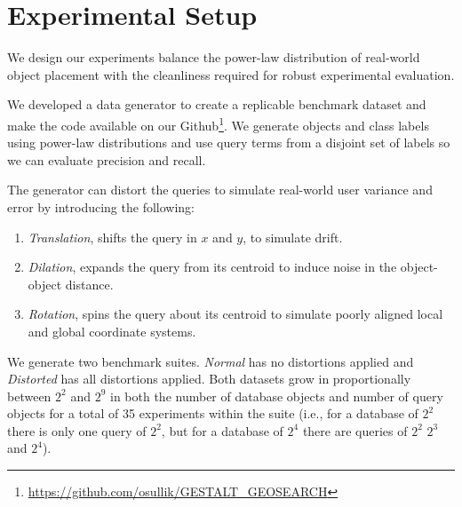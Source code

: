 \section{Experimental Setup}
\label{section:experimental_setup}


\par{
    We design our experiments balance the power-law distribution of real-world object placement with the cleanliness required for robust experimental evaluation. 
    }  
    
\par{
    We developed a data generator to create a replicable benchmark dataset and make the code available on our Github\footnote{\url{https://github.com/osullik/GESTALT_GEOSEARCH}}. We generate objects and class labels using power-law distributions and use query terms from a disjoint set of labels so we can evaluate precision and recall.
    }
   
\par{
    The generator can distort the queries to simulate real-world user variance and error by introducing the following:
    \begin{enumerate}
        \item \textit{Translation}, shifts the query in $x$ and $y$, to simulate drift.
        \item \textit{Dilation}, expands the query from its centroid to induce noise in the object-object distance.
        \item \textit{Rotation}, spins the query about its centroid to simulate poorly aligned local and global coordinate systems.
    \end{enumerate}
    }
\par{
    We generate two benchmark suites. \textit{Normal} has no distortions applied and \textit{Distorted} has all distortions applied. 
    Both datasets grow in proportionally between $2^2$ and $2^9$ in both the number of database objects and number of query objects for a total of 35 experiments within the suite (i.e., for a database of $2^2$ there is only one query of $2^2$, but for a database of $2^4$ there are queries of $2^2$ $2^3$ and $2^4$).
}


